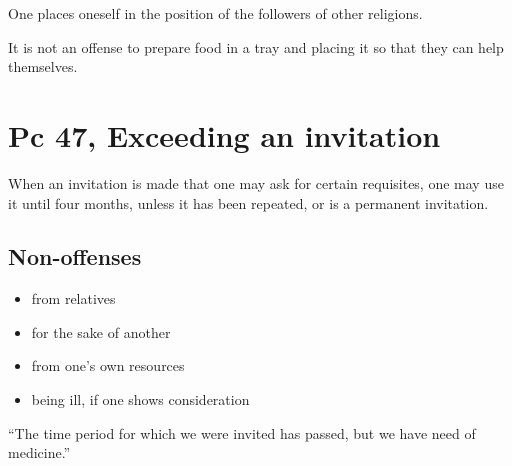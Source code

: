 One places oneself in the position of the followers of other religions.

It is not an offense to prepare food in a tray and placing it so that
they can help themselves.

\section{Pc 47, Exceeding an invitation}

When an invitation is made that one may ask for certain requisites, one
may use it until four months, unless it has been repeated, or is a
permanent invitation.

\subsection{Non-offenses}

\begin{multicols}{2}

\begin{itemize}
\tightlist
\item
  from relatives
\item
  for the sake of another
\item
  from one's own resources
\item
  being ill, if one shows consideration
\end{itemize}

\end{multicols}

``The time period for which we were invited has passed, but we have need
of medicine.''

